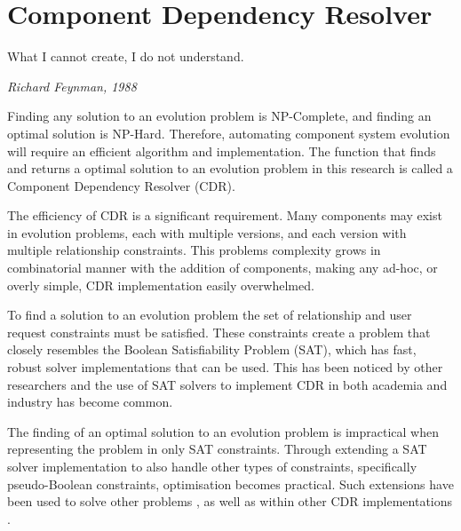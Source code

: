 \chapter{Component Dependency Resolver}
\label{implementation}
\epigraph{What I cannot create, I do not understand.}
{\textit{Richard Feynman, 1988}}

Finding any solution to an evolution problem is NP-Complete, and finding an optimal solution is NP-Hard.
Therefore, automating component system evolution will require an efficient algorithm and implementation.
The function that finds and returns a optimal solution to an evolution problem in this research is called a Component Dependency Resolver (CDR). 

The efficiency of CDR is a significant requirement.
Many components may exist in evolution problems, each with multiple versions, and each version with multiple relationship constraints.
This problems complexity grows  in combinatorial manner with the addition of components, making any ad-hoc, or overly simple, CDR implementation easily overwhelmed.

To find a solution to an evolution problem the set of relationship and user request constraints must be satisfied.
These constraints create a problem that closely resembles the Boolean Satisfiability Problem (SAT), which has fast, robust solver implementations that can be used.
This has been noticed by other researchers \citep{Berre2008,Mancinelli2006} 
and the use of SAT solvers to implement CDR in both academia \citep{abate2011} and industry \citep{leBerre2010} has become common.

The finding of an optimal solution to an evolution problem is impractical when representing the problem in only SAT constraints. 
Through extending a SAT solver implementation to also handle other types of constraints, specifically pseudo-Boolean constraints, optimisation becomes practical.
Such extensions have been used to solve other problems \citep{dixon2004automating}, as well as within other CDR implementations \citep{le_berre_dependency_2009}.

